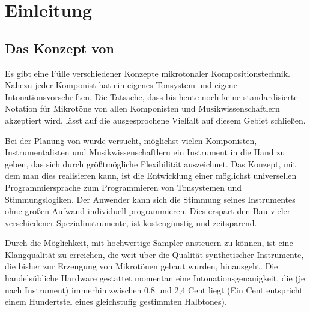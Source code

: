 \iffalse
\vfill

\begin{center}
\index{Autoren}
\vspace{1cm}
\textbf{Mutabor Soft, Gesellschaft bürgerlichen Rechts}
\vspace{-1cm}
\end{center}

Volker Abel       \hfill   Peter Reiss \\
Taubenweg 14      \hfill   Liebigstr. 9 \\
W-6101 Roßdorf    \hfill   W-6100 Darmstadt \\
Tel: 06154/81888  \hfill   Tel+Fax: 06151/292257 \\


\tableofcontents
\fi
%
%


\part{Einleitung}
\label{teilEinleit}


\chapter{Das Konzept von \mutabor{}}\label{cha:das-konzept-von-mutabor}

Es gibt eine Fülle verschiedener Konzepte mikrotonaler
Kompositionstechnik. Nahezu jeder Komponist hat ein eigenes
Tonsystem und eigene Intonationsvorschriften. Die Tatsache, dass
bis heute noch keine standardisierte Notation für Mikrotöne von
allen Komponisten und Musikwissenschaftlern akzeptiert wird, lässt
auf die ausgesprochene Vielfalt auf diesem Gebiet schließen.

Bei der Planung von \mutabor{} wurde versucht,
möglichst vielen Komponisten, Instrumentalisten und
Musikwissenschaftlern ein Instrument in die Hand zu geben, das
sich durch größtmögliche Flexibilität auszeichnet. Das Konzept,
mit dem man dies realisieren kann, ist die Entwicklung einer
möglichst universellen Programmiersprache zum Programmieren von
Tonsystemen und Stimmungslogiken. Der Anwender kann sich die
Stimmung seines Instrumentes ohne großen Aufwand individuell
programmieren. Dies erspart den Bau vieler verschiedener
Spezialinstrumente, ist kostengünstig und zeitsparend.

Durch die Möglichkeit, mit \mutabor{} hochwertige Sampler
ansteuern zu können, ist eine Klangqualität zu erreichen, die weit
über die Qualität synthetischer Instrumente, die bisher zur
Erzeugung von Mikrotönen gebaut wurden, hinausgeht. Die
handelsübliche Hardware gestattet momentan eine
Intonationsgenauigkeit, 
die (je nach Instrument) immerhin zwischen
0,8 und 2,4 Cent liegt (Ein Cent entspricht einem Hundertstel eines
gleichstufig gestimmten Halbtones).

